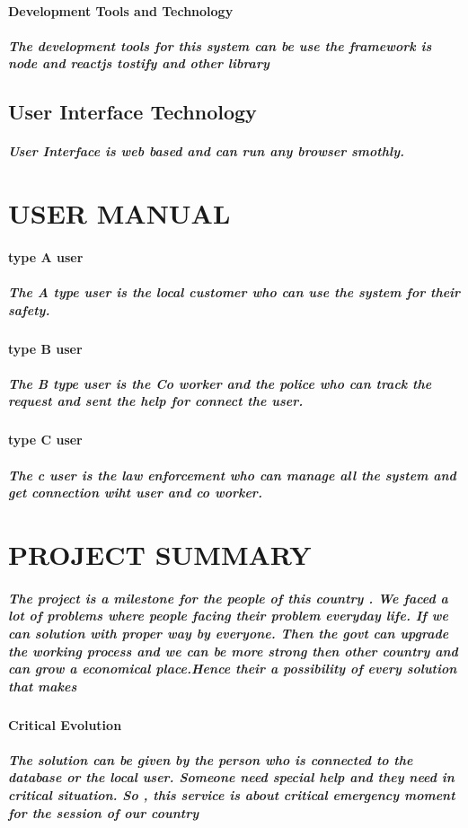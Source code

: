\documentclass{article}
\begin{document}
\paragraph{Development Tools and Technology}
\subparagraph{The development tools for this system can be use the framework is node and reactjs tostify and other library}
\subsection{User Interface Technology}
\subparagraph{User Interface is web based and can run any browser smothly.}



\newpage
\section{USER MANUAL}


\paragraph{type A user}
\subparagraph{The A type user is the local customer who can use the system for their safety.}

\paragraph{type B user}
\subparagraph{The B type user is the Co worker and the police who can track the request and sent the help for connect the user. }

\paragraph{type C user}
\subparagraph{The c user is the law enforcement who can manage all the system and get connection wiht user and co worker.}

\newpage
\section{PROJECT SUMMARY}
\subparagraph{The project is a milestone for the people of this country . We faced a lot of problems where people facing their problem everyday life. If we can 
solution with proper way by everyone. Then the govt can upgrade the working process and we can be more strong then other country and can grow a economical place.Hence their a possibility of every solution that makes }
\paragraph{Critical Evolution}
\subparagraph{The solution can be given by the person who is connected to the database or the local user. Someone need special help and they need in critical situation. So , this service is about critical emergency moment for the session of our country}
\end{document}
